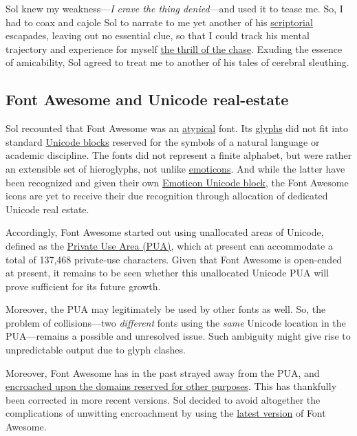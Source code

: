 \documentclass[
  british,
  a4paper,
  rgb,
  dvipsnames,
  svgnames,
  hyphens]{article}
\begin{document}
Sol knew my weakness---\emph{I crave the thing denied}---and used it to
tease me. So, I had to coax and cajole Sol to narrate to me yet another
of his \href{https://www.lexico.com/definition/scriptorial}{scriptorial}
escapades, leaving out no essential clue, so that I could track his
mental trajectory and experience for myself
\href{https://www.collinsdictionary.com/dictionary/english/the-thrill-of-the-chase}{the
thrill of the chase}. Exuding the essence of amicability, Sol agreed to
treat me to another of his tales of cerebral sleuthing.

\hypertarget{font-awesome-and-unicode-real-estate}{%
\subsection{Font Awesome and Unicode
real-estate}\label{font-awesome-and-unicode-real-estate}}

Sol recounted that Font Awesome was an
\href{https://www.merriam-webster.com/dictionary/atypical}{atypical}
font. Its \href{https://en.wikipedia.org/wiki/Glyph}{glyphs} did not fit
into standard \href{https://en.wikipedia.org/wiki/Unicode_block}{Unicode
blocks} reserved for the symbols of a natural language or academic
discipline. The fonts did not represent a finite alphabet, but were
rather an extensible set of hieroglyphs, not unlike
\href{https://en.wikipedia.org/wiki/Emoticon}{emoticons}. And while the
latter have been recognized and given their own
\href{https://en.wikipedia.org/wiki/Emoticons_(Unicode_block)}{Emoticon
Unicode block}, the Font Awesome icons are yet to receive their due
recognition through allocation of dedicated Unicode real estate.

Accordingly, Font Awesome started out using unallocated areas of
Unicode, defined as the
\href{https://www.unicode.org/faq/private_use.html}{Private Use Area
(PUA)}, which at present can accommodate a total of 137,468 private-use
characters. Given that Font Awesome is open-ended at present, it remains
to be seen whether this unallocated Unicode PUA will prove sufficient
for its future growth.

Moreover, the PUA may legitimately be used by other fonts as well. So,
the problem of collisions---two \emph{different} fonts using the
\emph{same} Unicode location in the PUA---remains a possible and
unresolved issue. Such ambiguity might give rise to unpredictable output
due to glyph clashes.

Moreover, Font Awesome has in the past strayed away from the PUA, and
\href{https://fontawesome.com/v5.15/how-to-use/on-the-web/advanced/css-pseudo-elements}{encroached
upon the domains reserved for other purposes}. This has thankfully been
corrected in more recent versions. Sol decided to avoid altogether the
complications of unwitting encroachment by using the
\href{https://fontawesome.com/download\#}{latest version} of Font
Awesome.
\end{document}
